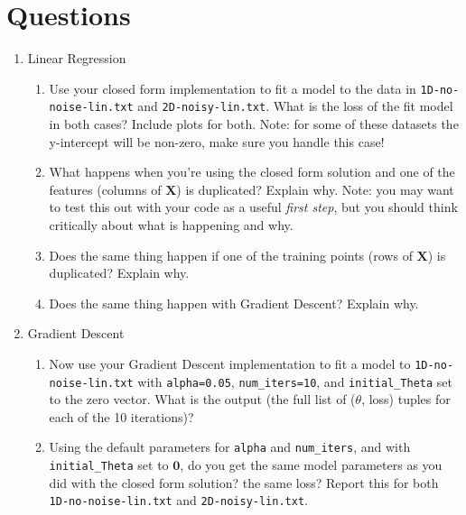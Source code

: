 \documentclass{article} %
\begin{document}
\section*{Questions}
\begin{enumerate}
	\item Linear Regression
	\begin{enumerate}
		\item Use your closed form implementation to fit a model to the data in \texttt{1D-no-noise-lin.txt} and 
		\texttt{2D-noisy-lin.txt}. What is the loss of the fit model in both cases? Include plots for both. Note: for some of 
		these datasets the y-intercept will be non-zero, make sure you handle this case!
		\item What happens when you're using the closed form solution and one of the features (columns of \(\textbf{X}\)) is 
		duplicated? Explain why. Note: you may want to test this out with your code as a useful \emph{first step}, but you should think critically about what is happening and why.
		\item Does the same thing happen if one of the training points (rows of \(\textbf{X}\)) is duplicated? Explain why.
		\item Does the same thing happen with Gradient Descent? Explain why.
	\end{enumerate}
	\item Gradient Descent
	\begin{enumerate}
		\item Now use your Gradient Descent implementation to fit a model to \texttt{1D-no-noise-lin.txt} with 
		\texttt{alpha=0.05}, \texttt{num\_iters=10}, and \texttt{initial\_Theta} set to the zero vector. What is the output 
		(the full list of (\(\theta\), loss) tuples for each of the 10 iterations)?
		
		\item Using the default parameters for \texttt{alpha} and \texttt{num\_iters}, and with \texttt{initial\_Theta} set to 
		\(\mathbf{0}\), do you get the same model parameters as you did with the closed form solution? the same loss? Report this for both \texttt{1D-no-noise-lin.txt} and \texttt{2D-noisy-lin.txt}.
		

\end{enumerate}
\end{enumerate}
\end{document}
